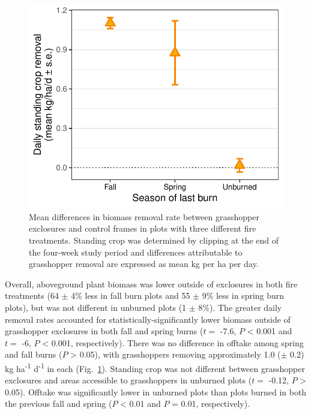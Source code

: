 \documentclass[referee, 
	            sn-basic]
           {sn-jnl}
\begin{document}
\begin{figure}
\centering
\includegraphics{removal_gg-1.pdf}
\caption{Mean differences in biomass removal rate between grasshopper exclosures and control frames in plots with three different fire treatments. 
Standing crop was determined by clipping at the end of the four-week study period and differences attributable to grasshopper removal are expressed as mean kg per ha per day.}
\label{removal} %
\end{figure}

Overall, aboveground plant biomass was lower outside of exclosures in both fire treatments (64 $\pm$ 4\% less in fall burn plots and 55 $\pm$ 9\% less in spring burn plots), but was not different in unburned plots (1 $\pm$ 8\%).
The greater daily removal rates accounted for statistically-significantly lower biomass outside of grasshopper exclosures in both fall and spring burns (\(t =\) -7.6,
\(P\) \textless{} 0.001 and \(t =\) -6, \(P\) \textless{} 0.001, respectively). 
There was no difference in offtake among spring and fall burns (\(P\) \textgreater{} 0.05), with grasshoppers removing approximately 1.0 ($\pm$ 0.2) kg ha\textsuperscript{-1} d\textsuperscript{-1} in each (Fig.~\ref{removal}). 
Standing crop was not different between grasshopper exclosures and areas accessible to grasshoppers in unburned plots (\(t =\) -0.12, \(P\) \textgreater{} 0.05).
 Offtake was significantly lower in unburned plots than plots burned in both the previous fall and spring (\(P\) \textless{} 0.01 and \(P\) = 0.01, respectively).
\end{document}
